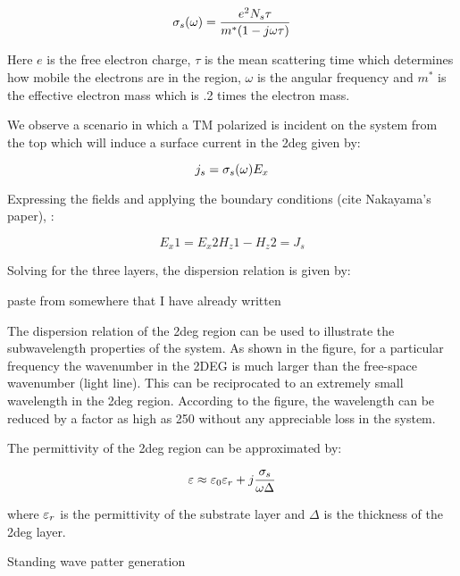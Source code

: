 \documentclass[11pt]{article}
\begin{document}
\begin{equation}
  \sigma_s(\omega) = \frac{e^2 N_s \tau}{m^{\ast}(1 - j \omega \tau)}
\end{equation}

Here $e$ is the free electron charge, $\tau$ is the mean scattering time which determines how mobile the electrons are in the region, $\omega$ is the angular frequency and $m^{\ast}$ is the effective electron mass which is .2 times the electron mass.

We observe a scenario in which a TM polarized is incident on the system from the top which will induce a surface current in the 2deg given by:

\begin{equation}
  j_s = \sigma_s(\omega) E_x
\end{equation}

Expressing the fields and applying the boundary conditions (cite Nakayama's paper), :

\begin{equation}
  E_x1 = E_x2
  H_z1 - H_z2 = J_s
\end{equation}

Solving for the three layers, the dispersion relation is given by:

$$$$ paste from somewhere that I have already written

The dispersion relation of the 2deg region can be used to illustrate the subwavelength properties of the system. As shown in the figure, for a particular frequency the wavenumber in the 2DEG is much larger than the free-space wavenumber (light line). This can be reciprocated to an extremely small wavelength in the 2deg region. According to the figure,  the wavelength can be reduced by a factor as high as 250 without any appreciable loss in the system.

The permittivity of the 2deg region can be approximated by:

\begin{equation}
  \varepsilon \approx \varepsilon_0 \varepsilon_r + j \frac{\sigma_s}{\omega \Delta}
\end{equation}

where $\varepsilon_r$ is the permittivity of the substrate layer and $\Delta$ is the thickness of the 2deg layer.


Standing wave patter generation
\end{document}
